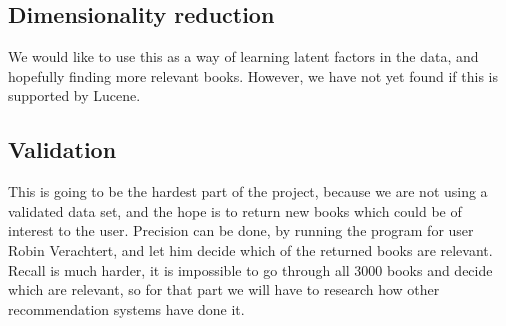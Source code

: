 \documentclass{scrartcl}
\begin{document}
\subsection{Dimensionality reduction}
We would like to use this as a way of learning latent factors in the data, and hopefully finding more relevant books. However, we have not yet found if this is supported by Lucene.
\subsection{Validation}
This is going to be the hardest part of the project, because we are not using a validated data set, and the hope is to return new books which could be of interest to the user. Precision can be done, by running the program for user Robin Verachtert, and let him decide which of the returned books are relevant. Recall is much harder, it is impossible to go through all 3000 books and decide which are relevant, so for that part we will have to research how other recommendation systems have done it.
\end{document}
